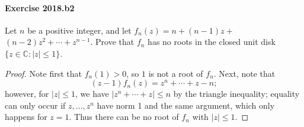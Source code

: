 \documentclass{article}
\begin{document}
\paragraph{Exercise 2018.b2} Let $n$ be a positive integer, and let $f_{n}(z)=n+(n-1) z+$ $(n-2) z^{2}+\cdots+z^{n-1}$. Prove that $f_{n}$ has no roots in the closed unit disk $\{z \in \mathbb{C}:|z| \leq 1\}$.
\begin{proof}
    Note first that $f_n(1) > 0$, so $1$ is not a root of $f_n$.
Next, note that
\[
(z-1)f_n(z) = z^n + \cdots + z - n;
\]
however, for $\left| z \right| \leq 1$, we have 
$\left| z^n + \cdots + z \right| \leq n$ by the triangle inequality;
equality can only occur if $z,\dots,z^n$ have norm 1 and the same argument, which only happens for $z=1$.
Thus there can be no root of $f_n$ with $|z| \leq 1$.
\end{proof}
\end{document}

